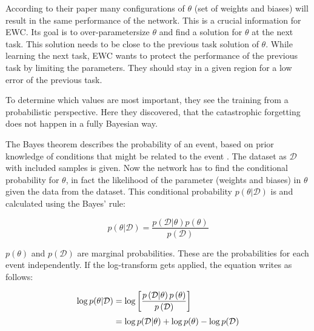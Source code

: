 According to their paper many configurations of $\theta$ (set of weights and biases) will result in the same performance of the network.
This is a crucial information for EWC.
Its goal is to over-parametersize $\theta$ and find a solution for $\theta$ at the next task.
This solution needs to be close to the previous task solution of $\theta$.
While learning the next task, EWC wants to protect the performance of the previous task by limiting the parameters.
They should stay in a given region for a low error of the previous task.
\cite{elastic-weight-consolidation}

To determine which values are most important, they see the training from a probabilistic perspective.
Here they discovered, that the catastrophic forgetting does not happen in a fully Bayesian way.
\cite{elastic-weight-consolidation}

The Bayes theorem describes the probability of an event, based on prior knowledge of conditions that might be related to the event \cite{Bayes_theorem}. \cite{elastic-weight-consolidation, schaeffer_ewc}
\newline
The dataset as $\mathcal{D}$ with included samples is given.
Now the network has to find the conditional probability for $\theta$, in fact the likelihood of the parameter (weights and biases) in $\theta$ given the data from the dataset.
This conditional probability $p \left(\theta | \mathcal{D} \right)$ is and calculated using the Bayes' rule: \cite{elastic-weight-consolidation, schaeffer_ewc}

\begin{equation}
    p \left( \theta | \mathcal{D} \right) = \frac{p \left(\mathcal{D}|\theta\right) p\left(\theta\right)}{p \left( \mathcal{D} \right)}
\end{equation}

$p \left( \theta \right)$ and $p \left( \mathcal{D} \right)$ are marginal probabilities. These are the probabilities for each event independently.
\newline
If the log-transform gets applied, the equation writes as follows: \cite{elastic-weight-consolidation, schaeffer_ewc}

\begin{equation}
    \setlength{\jot}{5pt}
    \begin{split}
        \log p(\theta | \mathcal{D}) & = \log \left[ 
                \frac{p \left(\mathcal{D}|\theta\right) p\left(\theta\right)}{p \left( \mathcal{D} \right)} 
            \right]
        \\
        & = \log p(\mathcal{D} | \theta) + \log p(\theta) - \log p(\mathcal{D})
    \end{split}
    \label{eq:bayes_applied_log}
\end{equation}

